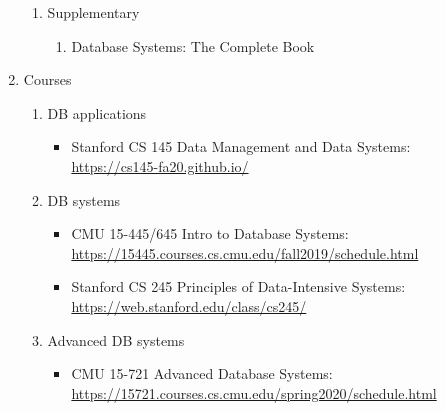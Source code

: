 \documentclass{article}
\begin{document}
\begin{enumerate}
\begin{enumerate}
    \item Supplementary
        \begin{enumerate}
            \item Database Systems: The Complete Book
            \cite{garcia2008database}
        \end{enumerate}
    \end{enumerate}
    \item Courses
    \begin{enumerate}
        \item DB applications
        \begin{itemize}
            \item Stanford CS 145 Data Management and Data Systems:\\
            \href{https://cs145-fa20.github.io/}{https://cs145-fa20.github.io/}
        \end{itemize}
        \item DB systems
        \begin{itemize}
            \item CMU 15-445/645 Intro to Database Systems:\\
            \href{https://15445.courses.cs.cmu.edu/fall2019/schedule.html}{https://15445.courses.cs.cmu.edu/fall2019/schedule.html}
            \item Stanford CS 245 Principles of Data-Intensive Systems:\\
            \href{https://web.stanford.edu/class/cs245/}{https://web.stanford.edu/class/cs245/}
        \end{itemize}
            \item Advanced DB systems
            \begin{itemize}
                \item CMU 15-721 Advanced Database Systems:\\
                \href{https://15721.courses.cs.cmu.edu/spring2020/schedule.html}{https://15721.courses.cs.cmu.edu/spring2020/schedule.html}        
            \end{itemize}
    \end{enumerate}


\end{enumerate}
\end{document}
